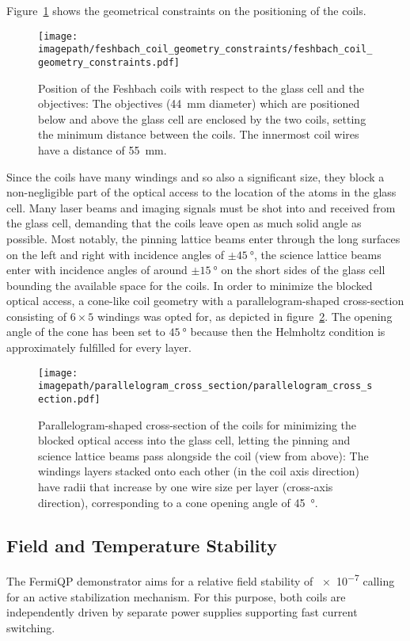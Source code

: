 Figure~\ref{fig:feshbach_coil_geometry_constraints} shows the geometrical constraints on the positioning of the coils.

\begin{figure}
    \centering
    \texttt{[image: \\imagepath/feshbach\_coil\_geometry\_constraints/feshbach\_coil\_geometry\_constraints.pdf]}
    \caption{Position of the Feshbach coils with respect to the glass cell and the objectives: The objectives (\SI{44}{\milli\meter} diameter) which are positioned below and above the glass cell are enclosed by the two coils, setting the minimum distance between the coils. The innermost coil wires have a distance of \SI{55}{\milli\meter}.}
    \label{fig:feshbach_coil_geometry_constraints}
\end{figure}

Since the coils have many windings and so also a significant size, they block a non-negligible part of the optical access to the location of the atoms in the glass cell. Many laser beams and imaging signals must be shot into and received from the glass cell, demanding that the coils leave open as much solid angle as possible. Most notably, the pinning lattice beams enter through the long surfaces on the left and right with incidence angles of $\pm \SI{45}{\degree}$, the science lattice beams enter with incidence angles of around $\pm \SI{15}{\degree}$ on the short sides of the glass cell bounding the available space for the coils. In order to minimize the blocked optical access, a cone-like coil geometry with a parallelogram-shaped cross-section consisting of $6 \times 5$ windings was opted for, as depicted in figure~\ref{fig:parallelogram_cross_section}. The opening angle of the cone has been set to $\SI{45}{\degree}$ because then the Helmholtz condition is approximately fulfilled for every layer.
\begin{figure}
    \centering
    \texttt{[image: \\imagepath/parallelogram\_cross\_section/parallelogram\_cross\_section.pdf]}
    \caption{Parallelogram-shaped cross-section of the coils for minimizing the blocked optical access into the glass cell, letting the pinning and science lattice beams pass alongside the coil (view from above): The windings layers stacked onto each other (in the coil axis direction) have radii that increase by one wire size per layer (cross-axis direction), corresponding to a cone opening angle of \SI[]{45}{\degree}.}
    \label{fig:parallelogram_cross_section}
\end{figure}

\subsection*{Field and Temperature Stability}
The FermiQP demonstrator aims for a relative field stability of \SI{e-7}{} calling for an active stabilization mechanism. For this purpose, both coils are independently driven by separate power supplies supporting fast current switching.

